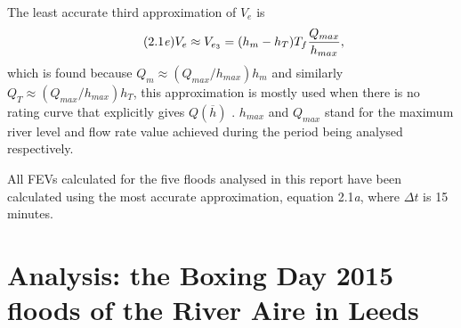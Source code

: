 \documentclass[11pt,a4paper]{article}
\begin{document}
The least accurate third approximation of $V_e$ is
\begin{equation}\tag{2.1\textit{e}}
V_e\approx V_{e_3}=(h_m-h_T)T_f\frac{Q_{max}}{h_{max}},
\end{equation}
which is found because $Q_m\approx (Q_{max}/h_{max})h_m$ and similarly $Q_T\approx (Q_{max}/h_{max})h_T$, this approximation is mostly used when there is no rating curve that explicitly gives $Q(\overline{h})$ \cite{Calder-Don}. $h_{max}$ and $Q_{max}$ stand for the maximum river level and flow rate value achieved during the period being analysed respectively. 

All FEVs calculated for the five floods analysed in this report have been calculated using the most accurate approximation, equation 2.1\textit{a}, where $\Delta t$ is 15 minutes.

\section{Analysis: the Boxing Day 2015 floods of the River Aire in Leeds}
\end{document}
